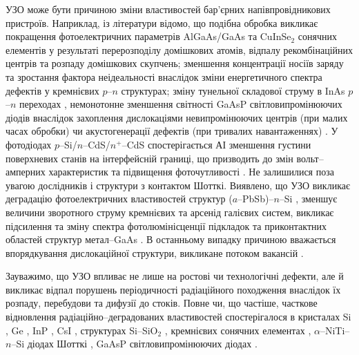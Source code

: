 УЗО може бути причиною зміни властивостей бар'єрних напівпровідникових пристроїв.
Наприклад, із літератури відомо, що подібна обробка викликає покращення фотоелектричних параметрів AlGaAs/GaAs \cite{Zaver2005} та CuInSe$_2$ \cite{OstapSC} сонячних елементів у результаті перерозподілу домішкових атомів, відпалу рекомбінаційних центрів та розпаду домішкових скупчень;
зменшення концентрації носіїв заряду \cite{Davletova2008}
та зростання фактора неідеальності \cite{Davletova2009}
внаслідок зміни енергетичного спектра дефектів у кремнієвих $p$--$n$ структурах;
зміну тунельної складової струму в InAs $p$--$n$ переходах \cite{Teterkin2009r},
немонотонне зменшення світності GaAsP світловипромінюючих діодів внаслідок захоплення дислокаціями невипромінюючих центрів (при малих часах обробки) чи акустогенерації дефектів (при тривалих навантаженнях) \cite{US:LED}.
У фотодіодах $p$--Si/$n$--CdS/$n^+$--CdS спостерігається АІ зменшення густини поверхневих станів на інтерфейсній границі,
що призводить до змін вольт--амперних характеристик та підвищення фоточутливості \cite{Mirsagatov,Mirsagatov2}.
Не залишилися поза увагою дослідників і структури з контактом Шотткі.
Виявлено, що УЗО викликає деградацію фотоелектричних властивостей структур ($a$--PbSb)--$n$--Si \cite{Pashaev2012r,PashOJA},
зменшує величини зворотного струму кремнієвих \cite{Tagaev} та арсенід галієвих \cite{UST:SDErmol} систем,
викликає підсилення та зміну спектра фотолюмінісценції підкладок та приконтактних областей структур метал--GaAs \cite{UST:SDErmol}.
В останньому випадку причиною вважається впорядкування дислокаційної структури, викликане потоком вакансій \cite{UST:SDErmol}.

Зауважимо, що УЗО впливає не лише на ростові чи технологічні дефекти, але й викликає відпал порушень періодичності радіаційного походження внаслідок їх розпаду, перебудови та дифузії до стоків.
Повне чи, що частіше, часткове відновлення радіаційно--деградованих властивостей спостерігалося
в кристалах Si  \cite{OstrovRadSi,Podolian2012r,PodolHivr,YOlikh2006TPLr}, Ge \cite{Olikh:FTP1996},
InP \cite{OlikhProc}, CsI \cite{UST:OstrovCsI}, структурах Si--SiO$_2$ \cite{Parchinskii2000r,Parchinskii2006r},
кремнієвих сонячних елементах \cite{YOlikh2007TPLr},
$\alpha$--NiTi--$n$--Si діодах Шотткі \cite{Pashaev2014r},
GaAsP світловипромінюючих діодах \cite{US:LED,UST:LED_SM}.



